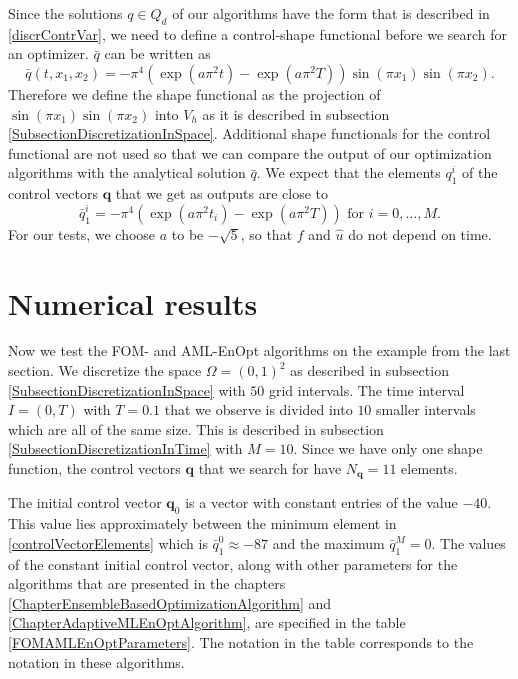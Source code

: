 Since the solutions $q\in Q_d$ of our algorithms have the form that is described in \eqref{discrContrVar}, we need to define a control-shape functional before we search for an optimizer. $\bar{q}$ can be written as
\begin{displaymath}
\bar{q}(t,x_1,x_2)=-\pi^4(\exp(a\pi^2t)-\exp(a\pi^2T))\sin(\pi x_1)\sin(\pi x_2).
\end{displaymath}
Therefore we define the shape functional as the projection of $\sin(\pi x_1)\sin(\pi x_2)$ into $V_h$ as it is described in subsection \ref{SubsectionDiscretizationInSpace}. Additional shape functionals for the control functional are not used so that we can compare the output of our optimization algorithms with the analytical solution $\bar{q}$. We expect that the elements $q^i_1$ of the control vectors $\mathbf{q}$ that we get as outputs are close to
\begin{equation}
\label{controlVectorElements}
\bar{q}^i_1=-\pi^4(\exp(a\pi^2t_i)-\exp(a\pi^2T))\text{ for }i=0,\dotsc,M.
\end{equation}
For our tests, we choose $a$ to be $-\sqrt{5}$, so that $f$ and $\hat{u}$ do not depend on time.

\section{Numerical results}

Now we test the FOM- and AML-EnOpt algorithms on the example from the last section. We discretize the space $\Omega=(0,1)^2$ as described in subsection \ref{SubsectionDiscretizationInSpace} with $50$ grid intervals. The time interval $I=(0,T)$ with $T=0.1$ that we observe is divided into $10$ smaller intervals which are all of the same size. This is described in subsection \ref{SubsectionDiscretizationInTime} with $M=10$. Since we have only one shape function, the control vectors $\mathbf{q}$ that we search for have $N_\mathbf{q}=11$ elements.

The initial control vector $\mathbf{q}_0$ is a vector with constant entries of the value $-40$. This value lies approximately between the minimum element in \eqref{controlVectorElements} which is $\bar{q}^0_1\approx-87$ and the maximum $\bar{q}^M_1=0$. The values of the constant initial control vector, along with other parameters for the algorithms that are presented in the chapters \ref{ChapterEnsembleBasedOptimizationAlgorithm} and \ref{ChapterAdaptiveMLEnOptAlgorithm}, are specified in the table \ref{FOMAMLEnOptParameters}. The notation in the table corresponds to the notation in these algorithms.

